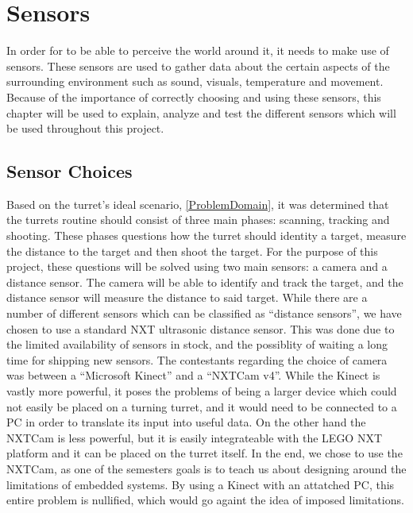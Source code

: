 \chapter{Sensors} \label{sensors}
In order for \name to be able to perceive the world around it, it needs to make
use of sensors. These sensors are used to gather data about the certain aspects
of the surrounding environment such as sound, visuals, temperature and
movement. Because of the importance of correctly choosing and using these
sensors, this chapter will be used to explain, analyze and test the different
sensors which will be used throughout this project.

\section{Sensor Choices}\label{SensorChoice}
Based on the turret's ideal scenario, \autoref{ProblemDomain}, it was
determined that the turrets routine should consist of three main phases:
scanning, tracking and shooting. These phases questions how the
turret should identity a target, measure the distance to the target and then shoot the
target. For the purpose of this project, these questions will be solved using
two main sensors: a camera and a distance sensor. The camera will be able to
identify and track the target, and the distance sensor will measure the
distance to said target. While there are a number of different sensors which
can be classified as ``distance sensors'', we have chosen to use a standard NXT
ultrasonic distance sensor. This was done due to the limited availability of
sensors in stock, and the possiblity of waiting a long time for shipping new
sensors. The contestants regarding the choice of camera was between a
``Microsoft Kinect'' and a ``NXTCam v4''. While the Kinect is vastly more
powerful, it poses the problems of being a larger device which could not easily
be placed on a turning turret, and it would need to be connected to a PC in
order to translate its input into useful data. On the other hand the NXTCam is less
powerful, but it is easily integrateable with the LEGO NXT platform and it can
be placed on the turret itself. In the end, we chose to use the NXTCam, as one
of the semesters goals is to teach us about designing around the limitations of
embedded systems. By using a Kinect with an attatched PC, this entire problem is
nullified, which would go againt the idea of imposed limitations.





% 
% 
% 
% 
